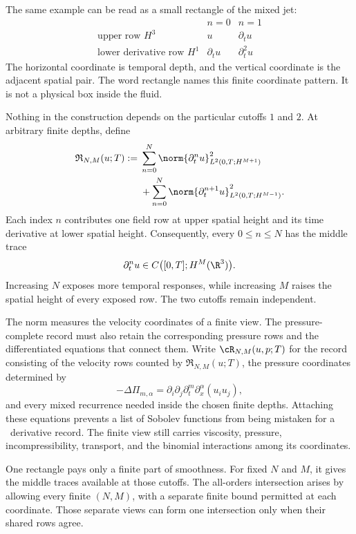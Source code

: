 The same example can be read as a small rectangle of the mixed jet:
\[
  \begin{array}{c|cc}
  & n=0 & n=1 \\
  \hline
  \text{upper row }H^3
  & u & \partial_tu \\
  \text{lower derivative row }H^1
  & \partial_tu & \partial_t^2u
  \end{array}
\]
The horizontal coordinate is temporal depth, and the vertical coordinate is the adjacent spatial pair.
The word rectangle names this finite coordinate pattern.
It is not a physical box inside the fluid.

Nothing in the construction depends on the particular cutoffs \(1\) and \(2\).
At arbitrary finite depths, define
\begin{align*}
  \mathfrak R_{N,M}(u;T)
  :={}&
  \sum_{n=0}^{N}
  \norm{\partial_t^n u}_{L^2(0,T;H^{M+1})}^{2}
  \\
  &+
  \sum_{n=0}^{N}
  \norm{\partial_t^{n+1}u}_{L^2(0,T;H^{M-1})}^{2}.
\end{align*}
Each index \(n\) contributes one field row at upper spatial height and its time derivative at lower spatial height.
Consequently, every \(0\leq n\leq N\) has the middle trace
\[
  \partial_t^n u
  \in
  C\bigl([0,T];H^M(\R^3)\bigr).
\]
Increasing \(N\) exposes more temporal responses, while increasing \(M\) raises the spatial height of every exposed row.
The two cutoffs remain independent.

The norm measures the velocity coordinates of a finite view.
The pressure-complete record must also retain the corresponding pressure rows and the differentiated equations that connect them.
Write \(\cR_{N,M}(u,p;T)\) for the record consisting of the velocity rows counted by \(\mathfrak R_{N,M}(u;T)\), the pressure coordinates determined by
\[
  -\Delta\Pi_{m,\alpha}
  =
  \partial_i\partial_j
  \partial_t^m\partial_x^\alpha(u_i u_j),
\]
and every mixed recurrence needed inside the chosen finite depths.
Attaching these equations prevents a list of Sobolev functions from being mistaken for a \NavierStokes\ derivative record.
The finite view still carries viscosity, pressure, incompressibility, transport, and the binomial interactions among its coordinates.

One rectangle pays only a finite part of smoothness.
For fixed \(N\) and \(M\), it gives the middle traces available at those cutoffs.
The all-orders intersection arises by allowing every finite \((N,M)\), with a separate finite bound permitted at each coordinate.
Those separate views can form one intersection only when their shared rows agree.
